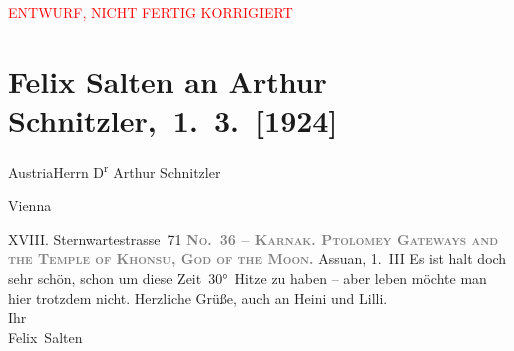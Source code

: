 
\begin{center}
            \textcolor{red}{ENTWURF, NICHT FERTIG KORRIGIERT}
                      \end{center}
            
         
         \renewcommand{\erwaehntePersonen}{Personen: Heinrich Schnitzler, Lilly Schnitzler}
         \renewcommand{\erwaehnteOrte}{Orte: Assuan, Karnak Tempelanlage, Old Cataract Hotel, Sternwartestraße 71, Wien, Österreich}
         \renewcommand{\erwaehnteWerke}{}
               \section[ Felix Salten an Arthur Schnitzler, 1. 3. {[}1924{]}]{ Felix Salten an Arthur Schnitzler, 1. 3. {[}1924{]}}\nopagebreak{}\rehead{ }\begin{ledgroupsized}[t]{13cm}\normalsize\beginnumbering \toendnotes[C]{\smallbreak\pagebreak[2]} 
\pstart{}{\pb}Austria\pend{}\pstart{}Herrn D\textsuperscript{r} Arthur Schnitzler\pend{}\pstart{}\begin{otherlanguage}{english}Vienna\end{otherlanguage}\pend{}\pstart{}XVIII. Sternwartestrasse 71\pend{}{\bigskip}\pstart
           \noindent{}{\pb}\textcolor{gray}{\textbf{\textsc{No. 36 – Karnak. Ptolomey Gateways and the Temple of Khonsu, God
                           of the Moon}.}}\pend
           \pstart
           \raggedleft{}{\pb}Assuan, 1. III\pend
           \pstart
           Es ist halt doch sehr schön, schon um diese Zeit 30° Hitze zu haben – aber leben
               möchte man hier trotzdem nicht. Herzliche Grüße, auch an Heini und Lilli.
               {\\}Ihr {\\}\spacefill\mbox{Felix Salten}\pend
           
         
         \endnumbering{}\end{ledgroupsized}  \newcommand{\dateiname}{L03594}\newcommand{\titel}{Felix Salten an Arthur Schnitzler, 1. 3. [1924]}\newcommand{\editorInnen}{Martin Anton Müller und Laura Untner}
      